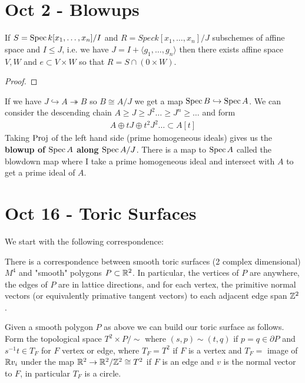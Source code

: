\documentclass[12pt]{article}
\begin{document}
\section{Oct 2 - Blowups}
\begin{theorem}
If $S = \operatorname{Spec} k[x_1,\dots,x_n]/I$ and $R = Spec k[x_1,\dots,x_n]/J$ subschemes of affine space and $I\leq J$, i.e. we have $J = I + \langle g_1,\dots,g_n \rangle$ then there exists affine space $V,W$ and $e\subset V\times W$ so that $R = S \cap (0\times W)$.
\end{theorem}
\begin{proof}
\end{proof}
If we have $J\hookrightarrow A \twoheadrightarrow B$ so $B\cong A/J$ we get a map $\operatorname{Spec} B\hookrightarrow \operatorname{Spec} A$. We can consider the descending chain $A\geq J\geq J^2\dots \geq J^n\geq \dots$ and form \begin{align*}
    A\oplus tJ\oplus t^2J^2\dots \subset A[t]
\end{align*} Taking $\operatorname{Proj}$ of the left hand side (prime homogeneous ideals) gives us the \textbf{blowup of $\operatorname{Spec} A$ along $\operatorname{Spec} A/J$}. There is a map to $\operatorname{Spec} A$ called the blowdown map where I take a prime homogeneous ideal and intersect with $A$ to get a prime ideal of $A$. 

\section{Oct 16 - Toric Surfaces}
We start with the following correspondence:\begin{theorem}
    There is a correspondence between smooth toric surfaces (2 complex dimensional) $M^4$ and "smooth" polygons $P\subset\mathbb{R}^2$. In particular, the vertices of $P$ are anywhere, the edges of $P$ are in lattice directions, and for each vertex, the primitive normal vectors (or equivalently primative tangent vectors) to each adjacent edge span $\mathbb{Z}^2$.
\end{theorem}

\hfill

Given a smooth polygon $P$ as above we can build our toric surface as follows. Form the topological space $T^2\times P/\sim$ where $(s,p)\sim(t,q)$ if $p=q\in\partial P$ and $s^{-1}t\in T_F$ for $F$ vertex or edge, where $T_F = T^2$ if $F$ is a vertex and $T_F =$ image of $\mathbb{R} v_i$ under the map $\mathbb{R}^2\to\mathbb{R}^2/\mathbb{Z}^2\cong T^2$ if $F$ is an edge and $v$ is the normal vector to $F$, in particular $T_F$ is a circle.

\hfill
\end{document}
